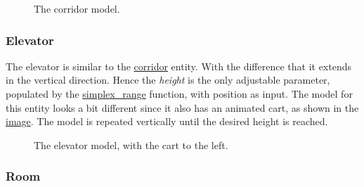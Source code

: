 \documentclass[a4paper]{article}
\begin{document}
\begin{figure}
\noindent{}\label{corridor-model}

\caption{The corridor model.}
\end{figure}


\subsubsection{Elevator%
  \label{elevator}%
}

The elevator is similar to the \hyperref[corridor]{corridor} entity. With the difference that it extends in the vertical direction. Hence the \emph{height} is the only adjustable parameter, populated by the \hyperref[simplex-range]{simplex\_range} function, with position as input. The model for this entity looks a bit different since it also has an animated cart, as shown in the \hyperref[elevator-model]{image}. The model is repeated vertically until the desired height is reached.

\begin{figure}
\noindent{}\label{elevator-model}

\caption{The elevator model, with the cart to the left.}
\end{figure}


\subsubsection{Room%
  \label{room}%
}
\end{document}
